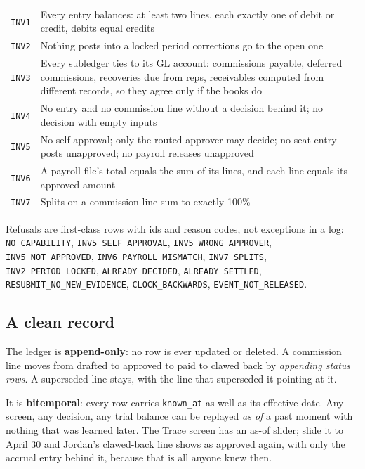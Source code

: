 \documentclass[10pt,a4paper]{article}
\newcommand{\gy}[1]{{\color{qgrey}#1}}
\newcommand{\code}[1]{{\small\texttt{#1}}}
\begin{document}
\begin{tabularx}{\textwidth}{@{}p{18mm}X@{}}
\toprule
\code{INV1} & Every entry balances: at least two lines, each exactly one of debit or credit, debits equal credits\\
\code{INV2} & Nothing posts into a locked period \gy{\textemdash{} corrections go to the open one}\\
\code{INV3} & Every subledger ties to its GL account: commissions payable, deferred commissions, recoveries due from reps, receivables \gy{\textemdash{} computed from different records, so they agree only if the books do}\\
\code{INV4} & No entry and no commission line without a decision behind it; no decision with empty inputs\\
\code{INV5} & No self-approval; only the routed approver may decide; no seat entry posts unapproved; no payroll releases unapproved\\
\code{INV6} & A payroll file's total equals the sum of its lines, and each line equals its approved amount\\
\code{INV7} & Splits on a commission line sum to exactly 100\%\\
\bottomrule
\end{tabularx}

\vspace{4pt}
Refusals are first-class rows with ids and reason codes, not exceptions in a log:
\code{NO\_CAPABILITY}, \code{INV5\_SELF\_APPROVAL}, \code{INV5\_WRONG\_APPROVER}, \code{INV5\_NOT\_APPROVED}, \code{INV6\_PAYROLL\_MISMATCH}, \code{INV7\_SPLITS}, \code{INV2\_PERIOD\_LOCKED}, \code{ALREADY\_DECIDED}, \code{ALREADY\_SETTLED}, \code{RESUBMIT\_NO\_NEW\_EVIDENCE}, \code{CLOCK\_BACKWARDS}, \code{EVENT\_NOT\_RELEASED}.

\subsection{A clean record}

The ledger is \textbf{append-only}: no row is ever updated or deleted. A commission line moves from drafted to approved to paid to clawed back by \emph{appending status rows}. A superseded line stays, with the line that superseded it pointing at it.

It is \textbf{bitemporal}: every row carries \code{known\_at} as well as its effective date. Any screen, any decision, any trial balance can be replayed \emph{as of} a past moment with nothing that was learned later. The Trace screen has an as-of slider; slide it to April 30 and Jordan's clawed-back line shows as approved again, with only the accrual entry behind it, because that is all anyone knew then.
\end{document}
